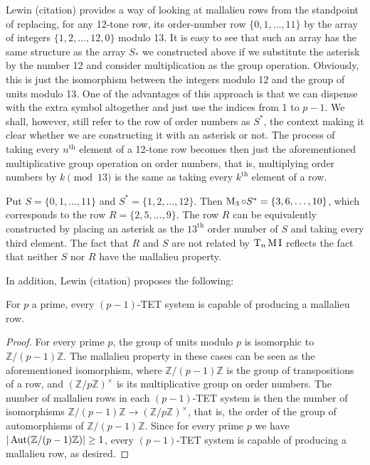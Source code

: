Lewin (citation) provides a way of looking at mallalieu rows from the standpoint of replacing, for any 12-tone row, its order-number row $\{ 0, 1, \dots, 11 \}$ by the array of integers $\{ 1, 2, \dots, 12, 0 \}$ modulo 13. It is easy to see that such an array has the same structure as the array $S_*$ we constructed above if we substitute the asterisk by the number 12 and consider multiplication as the group operation. Obviously, this is just the isomorphism between the integers modulo 12 and the group of units modulo 13. One of the advantages of this approach is that we can dispense with the extra symbol altogether and just use the indices from 1 to $p - 1$. We shall, however, still refer to the row of order numbers as $S^*$, the context making it clear whether we are constructing it with an asterisk or not. The process of taking every $n^\text{th}$ element of a 12-tone row becomes then just the aforementioned multiplicative group operation on order numbers, that is, multiplying order numbers by $k \pmod{13}$ is the same as taking every $k^\text{th}$ element of a row.

\begin{example} Put $S = \{ 0, 1, \dots, 11 \}$ and $S^* = \{ 1, 2, \dots, 12 \}$. Then $\operatorname{M}_3 \circ S^* = \{ 3, 6, \dots, 10 \}$, which corresponds to the row $R = \{ 2, 5, \dots, 9 \}$. The row $R$ can be equivalently constructed by placing an asterisk as the $13^\text{th}$ order number of $S$ and taking every third element. The fact that $R$ and $S$ are not related by $\operatorname{T}_n\operatorname{M}\operatorname{I}$ reflects the fact that neither $S$ nor $R$ have the mallalieu property.
\end{example}

In addition, Lewin (citation) proposes the following:

\begin{proposition} \label{mallalieu-Lewin} For $p$ a prime, every $(p - 1)$-TET system is capable of producing a mallalieu row.

\begin{proof} For every prime $p$, the group of units modulo $p$ is isomorphic to $\mathbb{Z} / (p - 1) \mathbb{Z}$. The mallalieu property in these cases can be seen as the aforementioned isomorphism, where $\mathbb{Z} / (p - 1) \mathbb{Z}$ is the group of transpositions of a row, and $(\mathbb{Z} / p \mathbb{Z})^\times$ is its multiplicative group on order numbers. The number of mallalieu rows in each $(p - 1)$-TET system is then the number of isomorphisms $\mathbb{Z} / (p - 1) \mathbb{Z} \to (\mathbb{Z} / p \mathbb{Z})^\times$, that is, the order of the group of automorphisms of $\mathbb{Z} / (p - 1) \mathbb{Z}$. Since for every prime $p$ we have $|\operatorname{Aut}(\mathbb{Z} / (p - 1) \mathbb{Z})| \geq 1$, every $(p - 1)$-TET system is capable of producing a mallalieu row, as desired.
\end{proof}
\end{proposition}


